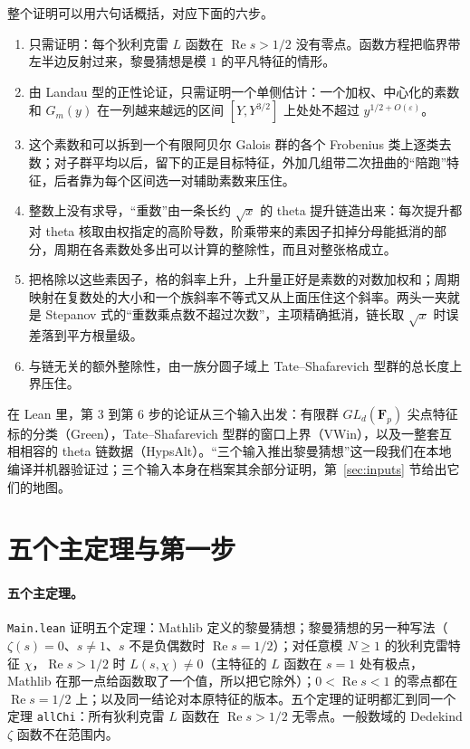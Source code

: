 \documentclass[11pt]{article}
\newcommand{\Lean}[1]{\texttt{\small #1}}
\renewcommand{\Re}{\operatorname{Re}}
\begin{document}
整个证明可以用六句话概括，对应下面的六步。
\begin{enumerate}
\item 只需证明：每个狄利克雷 $L$ 函数在 $\Re s>1/2$ 没有零点。函数方程把临界带左半边反射过来，黎曼猜想是模 $1$ 的平凡特征的情形。
\item 由 Landau 型的正性论证，只需证明一个单侧估计：一个加权、中心化的素数和 $G_m(y)$ 在一列越来越远的区间 $[Y,Y^{3/2}]$ 上处处不超过 $y^{1/2+O(\varepsilon)}$。
\item 这个素数和可以拆到一个有限阿贝尔 Galois 群的各个 Frobenius 类上逐类去数；对子群平均以后，留下的正是目标特征，外加几组带二次扭曲的“陪跑”特征，后者靠为每个区间选一对辅助素数来压住。
\item 整数上没有求导，“重数”由一条长约 $\sqrt x$ 的 theta 提升链造出来：每次提升都对 theta 核取由权指定的高阶导数，阶乘带来的素因子扣掉分母能抵消的部分，周期在各素数处多出可以计算的整除性，而且对整张格成立。
\item 把格除以这些素因子，格的斜率上升，上升量正好是素数的对数加权和；周期映射在复数处的大小和一个族斜率不等式又从上面压住这个斜率。两头一夹就是 Stepanov 式的“重数乘点数不超过次数”，主项精确抵消，链长取 $\sqrt x$ 时误差落到平方根量级。
\item 与链无关的额外整除性，由一族分圆子域上 Tate–Shafarevich 型群的总长度上界压住。
\end{enumerate}

在 Lean 里，第 3 到第 6 步的论证从三个输入出发：有限群 $GL_d(\mathbf F_p)$ 尖点特征标的分类（\textsf{Green}），Tate–Shafarevich 型群的窗口上界（\textsf{VWin}），以及一整套互相相容的 theta 链数据（\textsf{HypsAlt}）。“三个输入推出黎曼猜想”这一段我们在本地编译并机器验证过；三个输入本身在档案其余部分证明，第~\ref{sec:inputs} 节给出它们的地图。

\section{五个主定理与第一步}\label{sec:s1}

\paragraph{五个主定理。} \Lean{Main.lean} 证明五个定理：Mathlib 定义的黎曼猜想；黎曼猜想的另一种写法（$\zeta(s)=0$、$s\ne1$、$s$ 不是负偶数时 $\Re s=1/2$）；对任意模 $N\ge1$ 的狄利克雷特征 $\chi$，$\Re s>1/2$ 时 $L(s,\chi)\ne0$（主特征的 $L$ 函数在 $s=1$ 处有极点，Mathlib 在那一点给函数取了一个值，所以把它除外）；$0<\Re s<1$ 的零点都在 $\Re s=1/2$ 上；以及同一结论对本原特征的版本。五个定理的证明都汇到同一个定理 \Lean{allChi}：所有狄利克雷 $L$ 函数在 $\Re s>1/2$ 无零点。一般数域的 Dedekind $\zeta$ 函数不在范围内。
\end{document}
